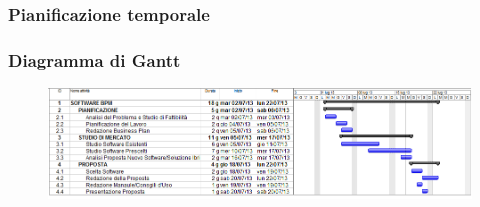 \documentclass[compress,9pt]{beamer}
\begin{document}
\subsubsection{Pianificazione temporale}
\begin{frame}%
\frametitle{Diagramma di Gantt}

\begin{figure}
  \includegraphics[width=\textwidth]{gantt}
\end{figure}

\begin{columns}
\end{columns}
\end{frame}
\end{document}
